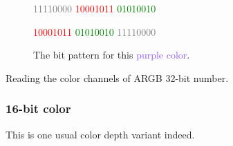 \begin{refsection}
  \begin{figure}
    \centering
    {\huge%
      \textcolor{gray}{11110000}%
      \textcolor{red}{10001011}%
      \textcolor{green}{01010010}%
      \textcolor{blue}{\fullbyte}}
    \par
    {\huge%
      \textcolor{red}{10001011}%
      \textcolor{green}{01010010}%
      \textcolor{blue}{\fullbyte}%
      \textcolor{gray}{11110000}%
    }

    \label{fig:32-bit-colors-bits}
    \caption{The bit pattern for this \textcolor[HTML]{8B52FF}{purple color}.}
  \end{figure}

  \begin{algorithm}[H]
    \caption{Reading the color channels of ARGB 32-bit number.}
    \label{alg:read-32-bit-rgb}
    \begin{algorithmic}[1]
    \end{algorithmic}
  \end{algorithm}

  \subsubsection{16-bit color}

  This is one usual color depth variant indeed.

  \printbibliography[heading=subbibliography]
\end{refsection}
